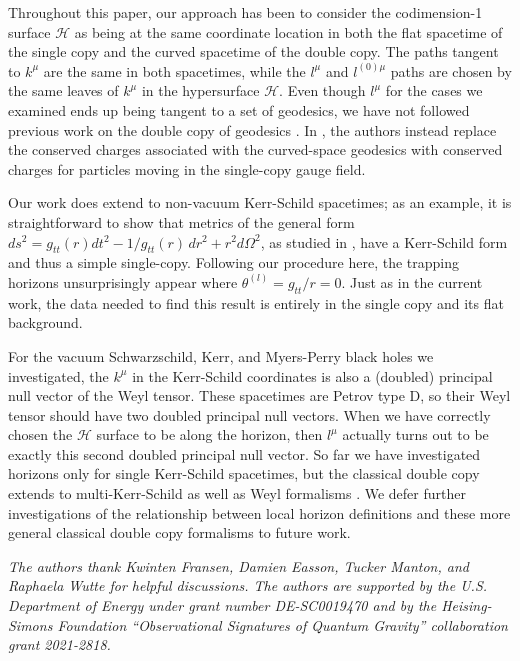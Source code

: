 Throughout this paper, our approach has been to consider the codimension-1 surface $\mathcal{H}$ as being at the same coordinate location in both the flat spacetime of the single copy and the curved spacetime of the double copy.  The paths tangent to $k^\mu$ are the same in both spacetimes, while the $l^\mu$ and $l^{(0)\mu}$ paths are chosen by the same leaves of $k^\mu$ in the hypersurface $\mathcal{H}$. Even though $l^\mu$ for the cases we examined ends up being tangent to a set of geodesics, we have not followed previous work on the double copy of geodesics \cite{Gonzo:2021drq}.  In \cite{Gonzo:2021drq}, the authors instead replace the conserved charges associated with the curved-space geodesics with conserved charges for particles moving in the single-copy gauge field.

Our work does extend to non-vacuum Kerr-Schild spacetimes; as an example, it is straightforward to show that metrics of the general form $ds^2=g_{tt}(r) dt^2-1/g_{tt}(r)\, dr^2+r^2d\Omega^2$, as studied in \cite{Easson:2020esh}, have a Kerr-Schild form and thus a simple single-copy.  Following our procedure here, the trapping horizons unsurprisingly appear where $\theta^{(l)} = g_{tt}/r=0$.  Just as in the current work, the data needed to find this result is entirely in the single copy and its flat background.

For the vacuum Schwarzschild, Kerr, and Myers-Perry black holes we investigated, the $k^\mu$ in the Kerr-Schild coordinates is also a (doubled) principal null vector of the Weyl tensor.  These spacetimes are Petrov type D, so their Weyl tensor should have two doubled principal null vectors. When we have correctly chosen the $\mathcal{H}$ surface to be along the horizon, then $l^\mu$ actually turns out to be exactly this second doubled principal null vector.  So far we have investigated horizons only for single Kerr-Schild spacetimes, but the classical double copy extends to multi-Kerr-Schild \cite{Chawla:2022ogv, Luna:2015paa} as well as Weyl formalisms \cite{Luna:2018dpt,Godazgar:2020zbv}. We defer further investigations of the relationship between local horizon definitions and these more general classical double copy formalisms to future work.

\textit{The authors thank Kwinten Fransen, Damien Easson, Tucker Manton, and Raphaela Wutte for helpful discussions.
        The authors are supported by the U.S. Department of Energy under grant number DE-SC0019470 and by the
        Heising-Simons Foundation ``Observational Signatures of Quantum Gravity'' collaboration grant 2021-2818.}

\nobibintoc

\printbibliography[heading=subbibliography]
